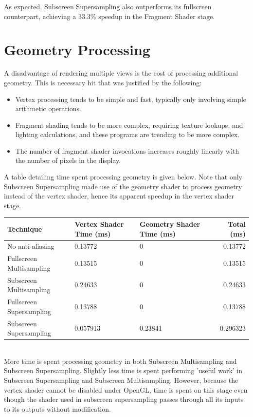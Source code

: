 \documentclass[12pt,a4paper,twoside,openright]{report}
\begin{document}
\noindent As expected, Subscreen Supersampling also outperforms its fullscreen counterpart, achieving a 33.3\% speedup in the Fragment Shader stage. 

\section{Geometry Processing}

A disadvantage of rendering multiple views is the cost of processing additional geometry. This is necessary hit that was justified by the following:

\begin{itemize}
\item Vertex processing tends to be simple and fast, typically only involving simple arithmetic operations.
\item Fragment shading tends to be more complex, requiring texture lookups, and lighting calculations, and these programs are trending to be more complex.
\item The number of fragment shader invocations increases roughly linearly with the number of pixels in the display. 
\end{itemize}

A table detailing time spent processing geometry is given below. Note that only Subscreen Supersampling made use of the geometry shader to process geometry instead of the vertex shader, hence its apparent speedup in the vertex shader stage.  

\begin{tabular}{l|b{2.8cm}|b{3.5cm}|r}
Technique   & Vertex Shader Time (ms) & Geometry Shader Time (ms) & Total (ms) \\ 
\hline
No anti-aliasing      & 0.13772 & 0 & 0.13772 \\
Fullscreen Multisampling     & 0.13515 & 0 & 0.13515 \\
Subscreen Multisampling    &  0.24633 & 0 & 0.24633 \\
Fullscreen Supersampling      & 0.13788 & 0 & 0.13788 \\
Subscreen Supersampling    & 0.057913  & 0.23841 & 0.296323 \\
\end{tabular} \\

\noindent More time is spent processing geometry in both Subscreen Multisampling and Subscreen Supersampling. Slightly less time is spent performing 'useful work' in Subscreen Supersampling and Subscreen Multisampling. However, because the vertex shader cannot be disabled under OpenGL, time is spent on this stage even though the shader used in subscreen supersampling passes through all its inputs to its outputs without modification.  
\end{document}
